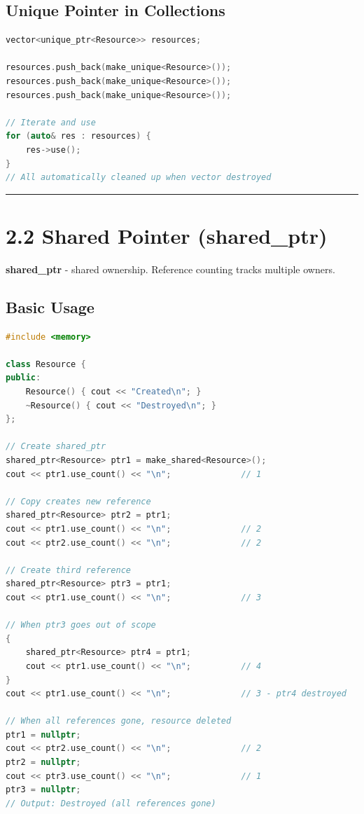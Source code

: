 \hypertarget{unique-pointer-in-collections}{%
\subsection{Unique Pointer in
Collections}\label{unique-pointer-in-collections}}

\begin{lstlisting}[language={C++}]
vector<unique_ptr<Resource>> resources;

resources.push_back(make_unique<Resource>());
resources.push_back(make_unique<Resource>());
resources.push_back(make_unique<Resource>());

// Iterate and use
for (auto& res : resources) {
    res->use();
}
// All automatically cleaned up when vector destroyed
\end{lstlisting}

\begin{center}\rule{0.5\linewidth}{0.5pt}\end{center}

\hypertarget{shared-pointer-shared_ptr}{%
\section{2.2 Shared Pointer
(shared\_ptr)}\label{shared-pointer-shared_ptr}}

\textbf{shared\_ptr} - shared ownership. Reference counting tracks
multiple owners.

\hypertarget{basic-usage-1}{%
\subsection{Basic Usage}\label{basic-usage-1}}

\begin{lstlisting}[language={C++}]
#include <memory>

class Resource {
public:
    Resource() { cout << "Created\n"; }
    ~Resource() { cout << "Destroyed\n"; }
};

// Create shared_ptr
shared_ptr<Resource> ptr1 = make_shared<Resource>();
cout << ptr1.use_count() << "\n";              // 1

// Copy creates new reference
shared_ptr<Resource> ptr2 = ptr1;
cout << ptr1.use_count() << "\n";              // 2
cout << ptr2.use_count() << "\n";              // 2

// Create third reference
shared_ptr<Resource> ptr3 = ptr1;
cout << ptr1.use_count() << "\n";              // 3

// When ptr3 goes out of scope
{
    shared_ptr<Resource> ptr4 = ptr1;
    cout << ptr1.use_count() << "\n";          // 4
}
cout << ptr1.use_count() << "\n";              // 3 - ptr4 destroyed

// When all references gone, resource deleted
ptr1 = nullptr;
cout << ptr2.use_count() << "\n";              // 2
ptr2 = nullptr;
cout << ptr3.use_count() << "\n";              // 1
ptr3 = nullptr;
// Output: Destroyed (all references gone)
\end{lstlisting}

